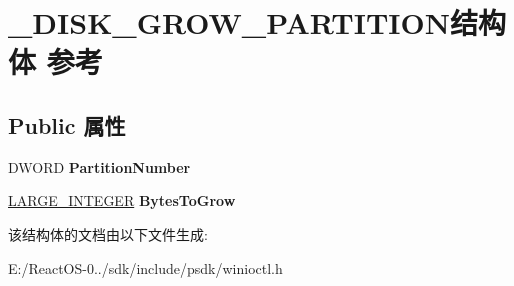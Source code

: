 \hypertarget{struct___d_i_s_k___g_r_o_w___p_a_r_t_i_t_i_o_n}{}\section{\+\_\+\+D\+I\+S\+K\+\_\+\+G\+R\+O\+W\+\_\+\+P\+A\+R\+T\+I\+T\+I\+O\+N结构体 参考}
\label{struct___d_i_s_k___g_r_o_w___p_a_r_t_i_t_i_o_n}
\subsection*{Public 属性}
\begin{DoxyCompactItemize}
\item 
\mbox{\label{struct___d_i_s_k___g_r_o_w___p_a_r_t_i_t_i_o_n_a33e4360ad97863e1a41361f0948e8995}} 
D\+W\+O\+RD {\bfseries Partition\+Number}
\item 
\mbox{\label{struct___d_i_s_k___g_r_o_w___p_a_r_t_i_t_i_o_n_add215012d53bd2c4985b5a4c509c48ad}} 
\hyperlink{union___l_a_r_g_e___i_n_t_e_g_e_r}{L\+A\+R\+G\+E\+\_\+\+I\+N\+T\+E\+G\+ER} {\bfseries Bytes\+To\+Grow}
\end{DoxyCompactItemize}


该结构体的文档由以下文件生成\+:\begin{DoxyCompactItemize}
\item 
E\+:/\+React\+O\+S-\/0../sdk/include/psdk/winioctl.\+h\end{DoxyCompactItemize}
